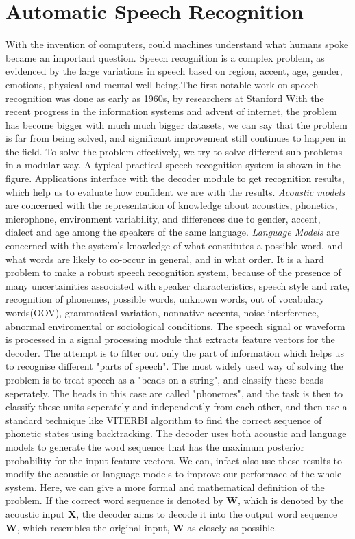 \documentclass[a4paper,11pt]{kth-mag}
\begin{document}
\section{Automatic Speech Recognition}
With the invention of computers, could machines understand what humans 
spoke became an important question. Speech recognition is a complex problem, as evidenced
by the large variations in speech based on region, accent, age, gender, emotions, physical 
and mental well-being.The first notable work on speech recognition was done as early as 1960s, 
by researchers at Stanford %
With the recent progress in the information systems and advent of internet,
the problem has become bigger with much much bigger datasets, we can say that the problem is far 
from being solved, and significant improvement still continues to happen in the field.
To solve the problem effectively, we try to solve different sub problems in a modular way.
A typical practical speech recognition system is shown in the figure. Applications 
interface with the decoder module to get recognition results, which help us to evaluate
how confident we are with the results. \textit{Acoustic models} are concerned with the
representation of knowledge about acoustics, phonetics, microphone, environment 
variability, and differences due to gender, accent, dialect and age among the speakers
of the same language. \textit{Language Models} are concerned with the system's knowledge
of what constitutes a possible word, and what words are likely to co-occur in general, 
and in what order. It is a hard problem to make a robust speech recognition system, 
because of the presence of many uncertainities associated with speaker characteristics,
speech style and rate, recognition of phonemes, possible words, unknown words, out of 
vocabulary words(OOV), grammatical variation, nonnative accents, noise interference, 
abnormal enviromental or sociological conditions.
The speech signal or waveform is processed in a signal processing module that extracts 
feature vectors for the decoder. The attempt is to filter out only the part of information
which helps us to recognise different "parts of speech".     
The most widely used way of solving the problem is to treat speech as a
"beads on a string", and classify these beads seperately. 
The beads in this case are called "phonemes", and the task is then to 
classify these units seperately and independently from each other, and
then use a standard technique like VITERBI algorithm to find the correct sequence
of phonetic states using backtracking. The decoder uses both acoustic and language
models to generate the word sequence that has the maximum posterior probability for
the input feature vectors. We can, infact also use these results to modify the 
acoustic or language models to improve our performace of the whole system.
Here, we can give a more formal and mathematical definition of the problem.
If the correct word sequence is denoted by \textbf{W}, which is denoted by
the acoustic input \textbf{X}, the decoder aims to decode it into the output
word sequence \textbf{W}, which resembles the original input, \textbf{W} as closely
as possible. 
\end{document}

